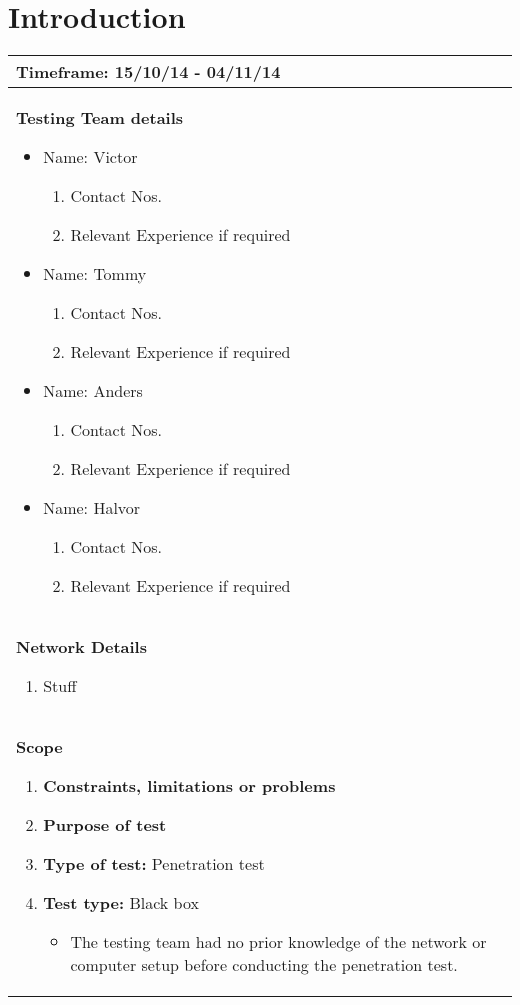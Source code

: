 \section{Introduction}

\begin{tabular}{|p{16.5cm}|}
\hline
\textbf{Timeframe:} 15/10/14 - 04/11/14  \\ \hline
\textbf{Testing Team details }
\begin{itemize}
	\item Name: Victor
	\begin{enumerate}
		\item Contact Nos.
		\item Relevant Experience if required
	\end{enumerate}
	\item Name: Tommy
	\begin{enumerate}
		\item Contact Nos.
		\item Relevant Experience if required
	\end{enumerate}
	\item Name: Anders
	\begin{enumerate}
		\item Contact Nos.
		\item Relevant Experience if required
	\end{enumerate}
	\item Name: Halvor
	\begin{enumerate}
		\item Contact Nos.
		\item Relevant Experience if required
	\end{enumerate}
\end{itemize}
\\ \hline
\textbf{Network Details }
\begin{enumerate}
	\item Stuff
\end{enumerate}
\\ \hline
\textbf{Scope }
\begin{enumerate}
	\item \textbf{Constraints, limitations or problems}
	\item \textbf{Purpose of test}
	\item \textbf{Type of test:}  Penetration test
	\item \textbf{Test type:} Black box
		\begin{itemize}
			\item The testing team had no prior knowledge of the network or computer setup before conducting the penetration test. 
		\end{itemize}
\end{enumerate}
\\ \hline
\end{tabular} 
